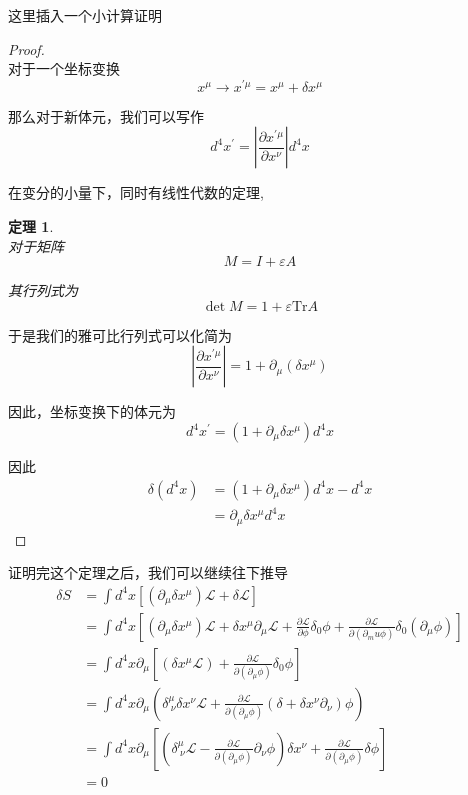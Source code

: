 \documentclass{article}
\newtheorem{theorem}{定理}
\begin{document}
这里插入一个小计算证明
\begin{proof}
    \ \\对于一个坐标变换\[x^\mu\to x^{\prime \mu}=x^\mu+\delta x^\mu\]

    那么对于新体元，我们可以写作
    \begin{equation*}
        d^4x^\prime=\left|\frac{\partial x^{\prime\mu}}{\partial x^\nu}\right|d^4x
    \end{equation*}

    在变分的小量下，同时有线性代数的定理,
    \begin{theorem}
        \ \\对于矩阵
        \begin{equation*}
            M=I+\varepsilon A
        \end{equation*}

        其行列式为
        \begin{equation*}
            \det M=1+\varepsilon\text{Tr}A
        \end{equation*}
    \end{theorem}
    
    于是我们的雅可比行列式可以化简为
    \begin{equation*}
        \left|\frac{\partial x^{\prime\mu}}{\partial x^\nu}\right|=1+\partial_\mu(\delta x^\mu)
    \end{equation*}

    因此，坐标变换下的体元为
    \begin{equation*}
        d^4x^\prime=(1+\partial_\mu\delta x^\mu)d^4x
    \end{equation*}

    因此
    \begin{align*}
        \delta(d^4x)&=(1+\partial_\mu\delta x^\mu)d^4x-d^4x\\
        &=\partial_\mu\delta x^\mu d^4x
    \end{align*}
\end{proof}

证明完这个定理之后，我们可以继续往下推导
\begin{align*}
    \delta S&=\int d^4x \left[\left(\partial_\mu\delta x^\mu\right)\mathcal{L}+\delta\mathcal{L}\right]\\
    &=\int d^4x \left[\left(\partial_\mu\delta x^\mu\right)\mathcal{L}+\delta x^\mu\partial_\mu\mathcal{L}+\frac{\partial \mathcal{L}}{\partial\phi}\delta_0\phi+\frac{\partial \mathcal{L}}{\partial (\partial_mu\phi)}\delta_0(\partial_\mu\phi)\right]\\
    &=\int d^4x \partial_\mu\left[\left(\delta x^\mu \mathcal{L}\right)+\frac{\partial\mathcal{L}}{\partial(\partial_\mu\phi)}\delta_0\phi\right]\\
    &=\int d^4x \partial_\mu \left(\delta^\mu_{\ \nu}\delta x^\nu\mathcal{L}+\frac{\partial\mathcal{L}}{\partial(\partial_\mu\phi)}\left(\delta+\delta x^\nu\partial_\nu\right)\phi\right)\\
    &=\int d^4x \partial_\mu\left[\left(\delta^\mu_{\ \nu}\mathcal{L}-\frac{\partial\mathcal{L}}{\partial(\partial_\mu\phi)}\partial_\nu\phi\right)\delta x^\nu+\frac{\partial\mathcal{L}}{\partial(\partial_\mu\phi)}\delta\phi\right]\\
    &=0
\end{align*}
\end{document}
